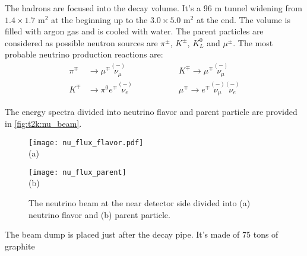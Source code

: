 \documentclass[../main.tex]{subfiles}
\begin{document}
The hadrons are focused into the decay volume. It's a 96 m tunnel widening from $1.4\times1.7\text{ m}^2$ at the beginning up to the $3.0\times5.0 \text{ m}^2$ at the end. The volume is filled with argon gas and is cooled with water. The parent particles are considered as possible neutron sources are $\pi^\pm$, $K^\pm$, $K^0_L$ and $\mu^\pm$. The most probable neutrino production reactions are:
\begin{align}
\pi^\mp&\to\mu^\mp\overset{\scriptscriptstyle(-)}{\nu_\mu} \hspace{2cm} &K^\mp\to\mu^\mp\overset{\scriptscriptstyle(-)}{\nu_\mu} \\
K^\mp&\to\pi^0e^\mp\overset{\scriptscriptstyle(-)}{\nu_e} \hspace{2cm}  &\mu^\mp\to e^\mp\overset{\scriptscriptstyle(-)}{\nu_\mu}\overset{\scriptscriptstyle(-)}{\nu_e}
\end{align}

The energy spectra divided into neutrino flavor and parent particle are provided in \autoref{fig:t2k:nu_beam}.

\begin{figure}[!ht]
  \begin{minipage}{0.49\linewidth}
    \centering
    \texttt{[image: nu\_flux\_flavor.pdf]} \\ (a)
  \end{minipage}
  \begin{minipage}{0.49\linewidth}
    \centering
    \texttt{[image: nu\_flux\_parent]} \\ (b)
  \end{minipage}
  \caption{The neutrino beam at the near detector side divided into (a) neutrino flavor and (b) parent particle.}
  \label{fig:t2k:nu_beam}
\end{figure}

The beam dump is placed just after the decay pipe. It's made of 75 tons of graphite 
\end{document}
